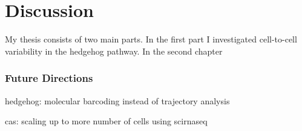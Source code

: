 \chapter{Discussion}
\label{chap:introduction}
\tightlists


My thesis consists of two main parts. In the first part I investigated cell-to-cell variability in the hedgehog pathway. In the second chapter 



\subsection{Future Directions}
hedgehog:
molecular barcoding instead of trajectory analysis


cas:
scaling up to more number of cells using scirnaseq


